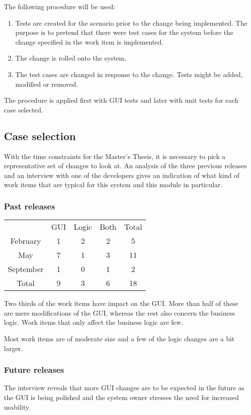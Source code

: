 \documentclass{article}
\begin{document}
		The following procedure will be used:

		\begin{enumerate}
			\item  Tests are created for the scenario prior to the change being implemented. The purpose is to pretend that there were test cases for the system before the change specified in the work item is implemented.
			\item The change is rolled onto the system.
			\item The test cases are changed in response to the change. Tests might be added, modified or removed.
		\end{enumerate}

		The procedure is applied first with GUI tests and later with unit tests for each case selected.

		\subsection{Case selection}
		With the time constraints for the Master's Thesis, it is necessary to pick a representative set of changes to look at.
		An analysis of the three previous releases and an interview with one of the developers gives an indication of what kind of work items that are typical for this system and this module in particular.

		\subsubsection{Past releases}
		
		\begin{tabular}{ c | c c c | c}
					 	& GUI & Logic & Both & Total\\
			February 	& 1 	& 2 	& 2 	& 5\\
			May 		& 7 	& 1 	& 3 	& 11\\
			September 	& 1 	& 0 	& 1 	& 2\\
			\hline
			Total 		& 9 	& 3 	& 6 	& 18\\
		\end{tabular}


		Two thirds of the work items have impact on the GUI. More than half of these are mere modifications of the GUI, whereas the rest also concern the business logic. Work items that only affect the business logic are few.

		Most work items are of moderate size and a few of the logic changes are a bit larger.
		
		\subsubsection{Future releases}
		The interview reveals that more GUI changes are to be expected in the future as the GUI is being polished and the system owner stresses the need for increased usability. 
\end{document}

